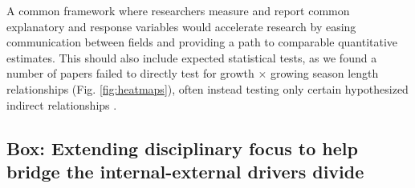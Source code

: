 \documentclass[11pt]{article}
\begin{document}
A common framework where researchers measure and report common explanatory and response variables would accelerate research by easing communication between fields and providing a path to comparable quantitative estimates. This should also include expected statistical tests, as we found a number of papers failed to directly test for growth $\times$ growing season length relationships (Fig. \ref{fig:heatmaps}), often instead testing only certain hypothesized indirect relationships \citep[e.g. spring temperature $\times$ growth in][]{dow2022warm}. %

\subsection*{Box: Extending disciplinary focus to help bridge the internal-external drivers divide} 

\end{document}
